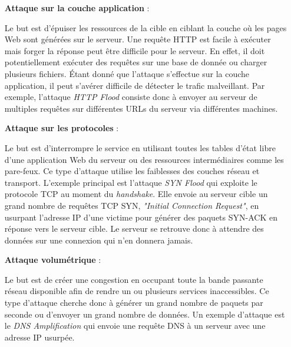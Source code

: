 \begin{itemize}
    \item[\textbf{Attaque sur la couche application}] :

    Le but est d'épuiser les ressources de la cible en ciblant la couche où les pages Web sont générées sur le serveur. Une requête HTTP est facile à exécuter mais forger la réponse peut être difficile pour le serveur. En effet, il doit potentiellement exécuter des requêtes sur une base de donnée ou charger plusieurs fichiers. Étant donné que l'attaque s'effectue sur la couche application, il peut s'avérer difficile de détecter le trafic malveillant. Par exemple, l'attaque \textit{HTTP Flood} consiste donc à envoyer au serveur de multiples requêtes sur différentes URLs du serveur via différentes machines.\newline

    \item[\textbf{Attaque sur les protocoles}] :

    Le but est d'interrompre le service en utilisant toutes les tables d'état libre d'une application Web du serveur ou des ressources intermédiaires comme les pare-feux. Ce type d'attaque utilise les faiblesses des couches réseau et transport. L'exemple principal est l'attaque \textit{SYN Flood} qui exploite le protocole TCP au moment du \textit{handshake}. Elle envoie au serveur cible un grand nombre de requêtes TCP SYN, \textit{"Initial Connection Request"}, en usurpant l'adresse IP d'une victime pour générer des paquets SYN-ACK en réponse vers le serveur cible. Le serveur se retrouve donc à attendre des données sur une connexion qui n'en donnera jamais.\newline

    \item [\textbf{Attaque volumétrique}] : 
    
    Le but est de créer une congestion en occupant toute la bande passante réseau disponible afin de rendre un ou plusieurs services inaccessibles. Ce type d'attaque cherche donc à générer un grand nombre de paquets par seconde ou d'envoyer un grand nombre de données. Un exemple d'attaque est le \textit{DNS Amplification} qui envoie une requête DNS à un serveur avec une adresse IP usurpée.
\end{itemize}

\vspace{2em}

